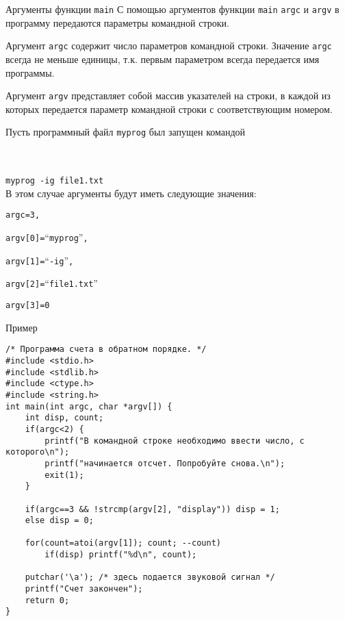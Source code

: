 \documentclass{beamer}
\begin{document}
\begin{frame}{Аргументы функции \texttt{main}}
    С помощью аргументов функции \texttt{main} \texttt{argc} и \texttt{argv} в программу передаются параметры командной строки. 
    
    \medskip
    Аргумент \texttt{argc} содержит число параметров командной строки. Значение \texttt{argc} всегда не меньше единицы, т.к. первым параметром всегда передается имя программы. 
    
    \medskip
    Аргумент \texttt{argv} представляет собой массив указателей на строки, в каждой из которых передается параметр командной строки с соответствующим номером.
    
    \medskip
    Пусть программный файл \texttt{myprog} был запущен командой
    
    \\ \\
    \texttt{myprog -ig file1.txt}
    \\
    
    В этом случае аргументы будут иметь следующие значения:
    \begin{alltt}
        argc = 3,
        
        argv[0] = “myprog”,
        
        argv[1] = “-ig”,
        
        argv[2] = “file1.txt”
        
        argv[3] = 0
    \end{alltt}
\end{frame}

\begin{frame}[fragile]{Пример}
\begin{verbatim}
/* Программа счета в обратном порядке. */
#include <stdio.h>
#include <stdlib.h>
#include <ctype.h>
#include <string.h>
int main(int argc, char *argv[]) {
    int disp, count;
    if(argc<2) {
        printf("В командной строке необходимо ввести число, с которого\n");
        printf("начинается отсчет. Попробуйте снова.\n");
        exit(1);
    }
    
    if(argc==3 && !strcmp(argv[2], "display")) disp = 1;
    else disp = 0;
    
    for(count=atoi(argv[1]); count; --count)
        if(disp) printf("%d\n", count);
    
    putchar('\a'); /* здесь подается звуковой сигнал */
    printf("Счет закончен");
    return 0;
}
\end{verbatim}
\end{frame}
\end{document}
